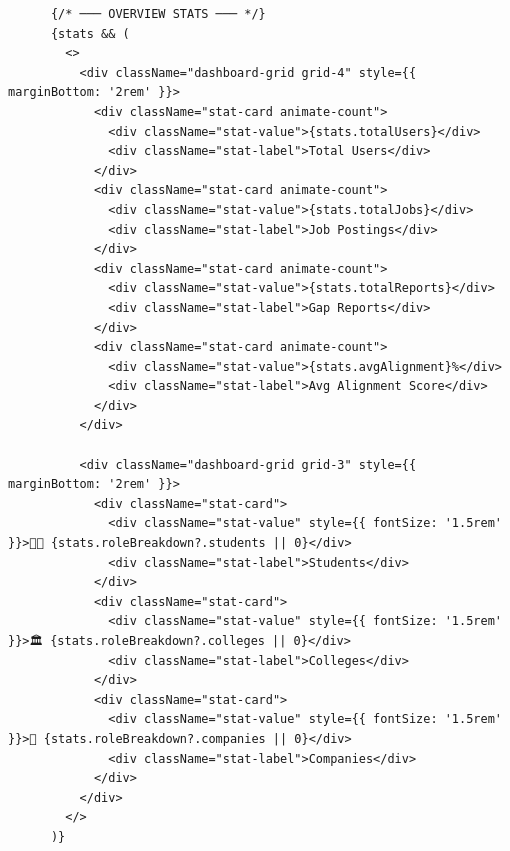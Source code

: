 \documentclass[12pt,a4paper]{report}
\begin{document}
\begin{verbatim}
      {/* ─── OVERVIEW STATS ─── */}
      {stats && (
        <>
          <div className="dashboard-grid grid-4" style={{ marginBottom: '2rem' }}>
            <div className="stat-card animate-count">
              <div className="stat-value">{stats.totalUsers}</div>
              <div className="stat-label">Total Users</div>
            </div>
            <div className="stat-card animate-count">
              <div className="stat-value">{stats.totalJobs}</div>
              <div className="stat-label">Job Postings</div>
            </div>
            <div className="stat-card animate-count">
              <div className="stat-value">{stats.totalReports}</div>
              <div className="stat-label">Gap Reports</div>
            </div>
            <div className="stat-card animate-count">
              <div className="stat-value">{stats.avgAlignment}%</div>
              <div className="stat-label">Avg Alignment Score</div>
            </div>
          </div>

          <div className="dashboard-grid grid-3" style={{ marginBottom: '2rem' }}>
            <div className="stat-card">
              <div className="stat-value" style={{ fontSize: '1.5rem' }}>🧑‍💻 {stats.roleBreakdown?.students || 0}</div>
              <div className="stat-label">Students</div>
            </div>
            <div className="stat-card">
              <div className="stat-value" style={{ fontSize: '1.5rem' }}>🏛️ {stats.roleBreakdown?.colleges || 0}</div>
              <div className="stat-label">Colleges</div>
            </div>
            <div className="stat-card">
              <div className="stat-value" style={{ fontSize: '1.5rem' }}>🤖 {stats.roleBreakdown?.companies || 0}</div>
              <div className="stat-label">Companies</div>
            </div>
          </div>
        </>
      )}


\end{verbatim}
\end{document}
